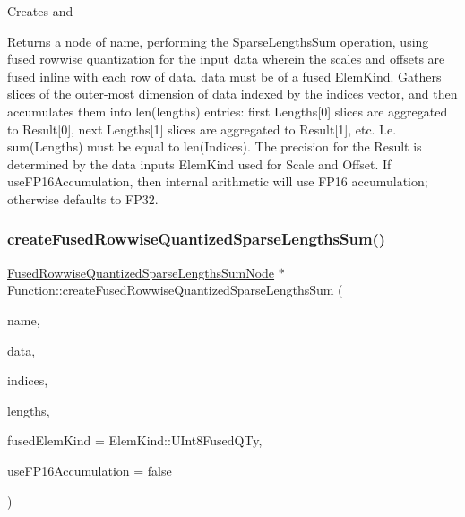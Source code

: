 Creates and \begin{DoxyReturn}{Returns}
a node of {\ttfamily name}, performing the Sparse\+Lengths\+Sum operation, using fused rowwise quantization for the input {\ttfamily data} wherein the scales and offsets are fused inline with each row of data. {\ttfamily data} must be of a fused Elem\+Kind. Gathers slices of the outer-\/most dimension of data indexed by the {\ttfamily indices} vector, and then accumulates them into len({\ttfamily lengths}) entries\+: first Lengths\mbox{[}0\mbox{]} slices are aggregated to Result\mbox{[}0\mbox{]}, next Lengths\mbox{[}1\mbox{]} slices are aggregated to Result\mbox{[}1\mbox{]}, etc. I.\+e. sum(\+Lengths) must be equal to len(\+Indices). The precision for the Result is determined by the {\ttfamily data} input\textquotesingle{}s Elem\+Kind used for Scale and Offset. If {\ttfamily use\+F\+P16\+Accumulation}, then internal arithmetic will use F\+P16 accumulation; otherwise defaults to F\+P32. 
\end{DoxyReturn}
\mbox{\label{classglow_1_1_function_a50fe21630865f07b5fcaba7dcdeff6cb}} 
\subsubsection{\texorpdfstring{create\+Fused\+Rowwise\+Quantized\+Sparse\+Lengths\+Sum()}{createFusedRowwiseQuantizedSparseLengthsSum()}\hspace{0.1cm}{\footnotesize\ttfamily [2/2]}}
{\footnotesize\ttfamily \hyperlink{classglow_1_1_fused_rowwise_quantized_sparse_lengths_sum_node}{Fused\+Rowwise\+Quantized\+Sparse\+Lengths\+Sum\+Node} $\ast$ Function\+::create\+Fused\+Rowwise\+Quantized\+Sparse\+Lengths\+Sum (\begin{DoxyParamCaption}\item[{llvm\+::\+String\+Ref}]{name,  }\item[{\hyperlink{classglow_1_1_tensor}{Tensor} \&}]{data,  }\item[{\hyperlink{structglow_1_1_node_value}{Node\+Value}}]{indices,  }\item[{\hyperlink{structglow_1_1_node_value}{Node\+Value}}]{lengths,  }\item[{\hyperlink{namespaceglow_ab92e14a94329daf4083db670e95fbcdf}{Elem\+Kind}}]{fused\+Elem\+Kind = {\ttfamily ElemKind\+:\+:UInt8FusedQTy},  }\item[{bool}]{use\+F\+P16\+Accumulation = {\ttfamily false} }\end{DoxyParamCaption})}

